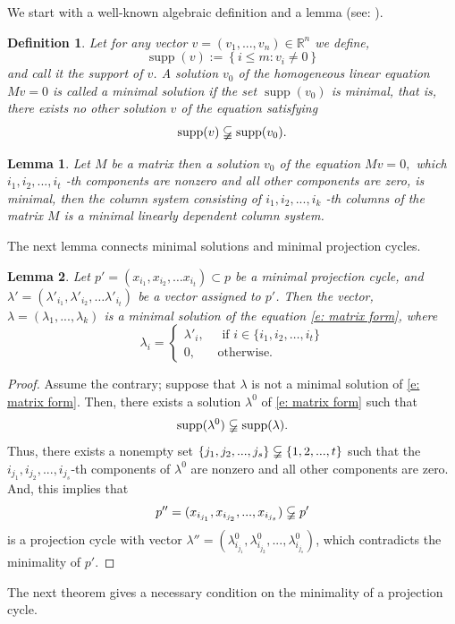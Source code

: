 \documentclass[12p]{article}
\numberwithin{equation}{section}
\newtheorem{definition}{Definition}[section]
\newtheorem{lemma}{Lemma}[section]
\begin{document}
We start with a well-known algebraic definition and a lemma (see: \cite[Definition 1 and Proposition 7]{Szalkai_Dosa}). 
\begin{definition}
    Let for any vector \(v=(v_1,...,v_n) \in \mathbb{R}^n\) we define,
    \[
    \operatorname{supp}(v):=\left\{i \leq m: v_i \neq 0\right\}
    \] and call it the support of \(v\). A solution \(v_0\) of the homogeneous linear equation 
    \(
    Mv=0
    \)
    is called a minimal solution if the set \(\operatorname{supp}(v_0)\) is minimal, that is, there exists no other solution \(v\) of the equation satisfying \[\operatorname{supp}(v)\varsubsetneqq \operatorname{supp}(v_0).\]
\end{definition}
\begin{lemma} Let \(M\) be a matrix then a solution \(v_0\) of the equation \(
    Mv=0,
    \)
    which \(i_1,i_2,...,i_t\) -th components are nonzero and all other components are zero, is minimal, then the column system consisting of \(i_1,i_2,...,i_k\) -th columns of the matrix \(M\) is a minimal linearly dependent column system.
\end{lemma}
The next lemma connects minimal solutions and minimal projection cycles.
\begin{lemma}
Let \(p'=(x_{i_1},x_{i_2},\dots x_{i_t}) \subset p\) be a minimal projection cycle, and \(\lambda'=(\lambda'_{i_1},\lambda'_{i_2},\dots \lambda'_{i_t})\) be a vector assigned to \(p'\). Then the vector, \(\lambda=(\lambda_1,...,\lambda_k)\) is a minimal solution of the equation \eqref{e: matrix form}, where
\begin{equation} \label{e: vector-g}
    \lambda_i=
    \begin{cases}
        \lambda'_i, \hspace{13pt} \text{ if } i \in \{i_1,i_2,\dots, i_t\} \\
        0, \hspace{17pt}\text{ otherwise.}
    \end{cases}
\end{equation}

\end{lemma}
\begin{proof}
    Assume the contrary; suppose that \(\lambda\) is not a minimal solution of \eqref{e: matrix form}. Then, there exists a solution \(\lambda^0\) of \eqref{e: matrix form} such that
    \[
    \operatorname{supp}(\lambda^0)\varsubsetneqq \operatorname{supp}(\lambda).
    \]
    Thus, there exists a nonempty set \(\{j_1,j_2,...,j_s\} \varsubsetneqq \{1,2,...,t\}\) such that the \(i_{j_1},i_{j_2},...,i_{j_s}\)-th components of \(\lambda^0\) are nonzero and all other components are zero. And, this implies that \[p''=(x_{i_{j_1}},x_{i_{j_2}},...,x_{i_{j_s}}) \varsubsetneqq p' \] is a projection cycle with vector \(\lambda''=(\lambda^0_{i_{j_1}},\lambda^0_{i_{j_2}},...,\lambda^0_{i_{j_s}})\), which contradicts the minimality of \(p'\).
\end{proof}
The next theorem gives a necessary condition on the minimality of a projection cycle.
\end{document}
